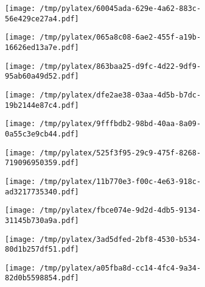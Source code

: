 \documentclass{article}
\begin{document}
\begin{figure}[htbp]
\begin{subfigure}[b]{.3\linewidth}
\texttt{[image: /tmp/pylatex/60045ada-629e-4a62-883c-56e429ce27a4.pdf]}
\end{subfigure}
\begin{subfigure}[b]{.3\linewidth}
\texttt{[image: /tmp/pylatex/065a8c08-6ae2-455f-a19b-16626ed13a7e.pdf]}
\end{subfigure}
\begin{subfigure}[b]{.3\linewidth}
\texttt{[image: /tmp/pylatex/863baa25-d9fc-4d22-9df9-95ab60a49d52.pdf]}
\end{subfigure}
\begin{subfigure}[b]{.3\linewidth}
\texttt{[image: /tmp/pylatex/dfe2ae38-03aa-4d5b-b7dc-19b2144e87c4.pdf]}
\end{subfigure}
\begin{subfigure}[b]{.3\linewidth}
\texttt{[image: /tmp/pylatex/9fffbdb2-98bd-40aa-8a09-0a55c3e9cb44.pdf]}
\end{subfigure}
\begin{subfigure}[b]{.3\linewidth}
\texttt{[image: /tmp/pylatex/525f3f95-29c9-475f-8268-719096950359.pdf]}
\end{subfigure}
\begin{subfigure}[b]{.3\linewidth}
\texttt{[image: /tmp/pylatex/11b770e3-f00c-4e63-918c-ad3217735340.pdf]}
\end{subfigure}
\begin{subfigure}[b]{.3\linewidth}
\texttt{[image: /tmp/pylatex/fbce074e-9d2d-4db5-9134-31145b730a9a.pdf]}
\end{subfigure}
\begin{subfigure}[b]{.3\linewidth}
\texttt{[image: /tmp/pylatex/3ad5dfed-2bf8-4530-b534-80d1b257df51.pdf]}
\end{subfigure}
\begin{subfigure}[b]{.3\linewidth}
\texttt{[image: /tmp/pylatex/a05fba8d-cc14-4fc4-9a34-82d0b5598854.pdf]}
\end{subfigure}
\end{figure}
\end{document}
